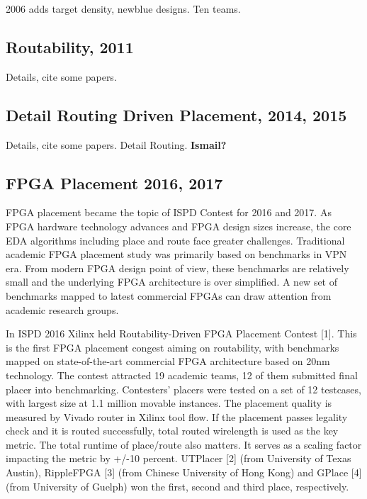 \documentclass[sigconf]{acmart}
\begin{document}
2006 adds target density, newblue designs.  Ten teams.  

\subsection{Routability, 2011}


Details, cite some papers.

\subsection{Detail Routing Driven Placement, 2014, 2015}

Details, cite some papers.
Detail Routing.
{\bf Ismail?}



\subsection{FPGA Placement 2016, 2017}

FPGA placement became the topic of ISPD Contest for 2016 and 2017. As
FPGA hardware technology advances and FPGA design sizes increase, the
core EDA algorithms including place and route face greater
challenges. Traditional academic FPGA placement study was primarily
based on benchmarks in VPN era. From modern FPGA design point of view,
these benchmarks are relatively small and the underlying FPGA
architecture is over simplified. A new set of benchmarks mapped to
latest commercial FPGAs can draw attention from academic research
groups.

In ISPD 2016 Xilinx held Routability-Driven FPGA Placement Contest
\cite{sy1}[1]. This is the first FPGA placement congest aiming on routability,
with benchmarks mapped on state-of-the-art commercial FPGA
architecture based on 20nm technology. The contest attracted 19
academic teams, 12 of them submitted final placer into
benchmarking. Contesters' placers were tested on a set of 12
testcases, with largest size at 1.1 million movable instances. The
placement quality is measured by Vivado router in Xilinx tool flow. If
the placement passes legality check and it is routed successfully,
total routed wirelength is used as the key metric. The total runtime
of place/route also matters. It serves as a scaling factor impacting
the metric by +/-10 percent.  UTPlacer\cite{sy2} [2] (from University of Texas
Austin), RippleFPGA\cite{sy3} [3] (from Chinese University of Hong Kong) and
GPlace\cite{sy4} [4] (from University of Guelph) won the first, second and third
place, respectively.
\end{document}

